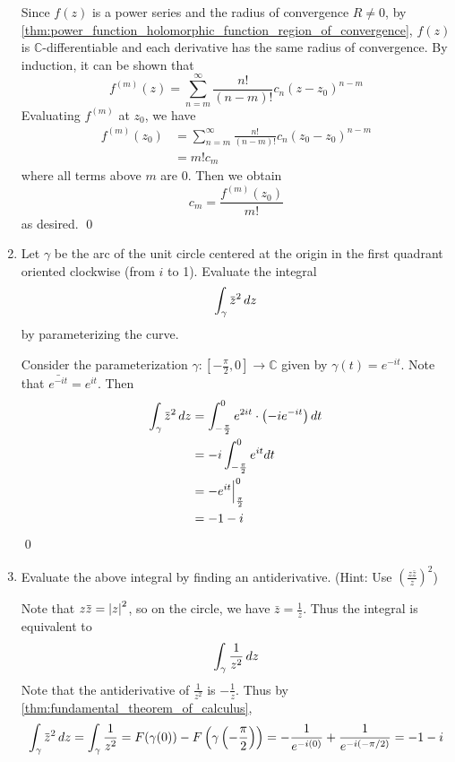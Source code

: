 \documentclass[11pt, oneside]{book}
\begin{document}
\begin{enumerate}
		\begin{solution}
			Since $f(z)$ is a power series and the radius of convergence $R \neq 0$, by \cref{thm:power_function_holomorphic_function_region_of_convergence}, $f(z)$ is $\mathbb{C}$-differentiable and each derivative has the same radius of convergence. By induction, it can be shown that
			\begin{equation*}
				f^{(m)}(z) = \sum_{n=m}^{\infty} \frac{n!}{(n - m)!} c_n (z - z_0)^{n - m} 
			\end{equation*}
			Evaluating $f^{(m)}$ at $z_0$, we have
			\begin{align*}
				f^{(m)}(z_0)
					&= \sum_{n=m}^{\infty} \frac{n!}{(n - m)!} c_n (z_0 - z_0)^{n - m} \\
					&= m! c_m
			\end{align*}
			where all terms above $m$ are 0. Then we obtain
			\begin{equation*}
				c_m = \frac{f^{(m)}(z_0)}{m!}
			\end{equation*}
			as desired. \qed
		\end{solution}
	\item Let $\gamma$ be the arc of the unit circle centered at the origin in the first quadrant oriented clockwise (from $i$ to 1). Evaluate the integral
		\begin{equation*}
			\int_{\gamma} \bar{z}^2 \dif{z}
		\end{equation*}
		by parameterizing the curve.

		\begin{solution}
			Consider the parameterization $\gamma: [ -\frac{\pi}{2}, 0 ] \to \mathbb{C}$ given by $\gamma(t) = e^{-it}$. Note that $\bar{e^{-it}} = e^{it}$. Then
			\begin{align*}
				\int_{\gamma} \bar{z}^2 \dif{z}
					&= \int_{-\frac{\pi}{2}}^{0} e^{2it} \cdot \left( -i e^{-it} \right) dt \\
					&= -i \int_{-\frac{\pi}{2}}^{0} e^{it} dt \\
					&= -e^{it} \at{\frac{\pi}{2}}{0} \\
					&= - 1 - i
			\end{align*}\qed
		\end{solution}
	\item Evaluate the above integral by finding an antiderivative. (Hint: Use $\left(\frac{z\bar{z}}{z} \right)^2$)
		\begin{solution}
			Note that $z\bar{z} = \abs{z}^2$, so on the circle, we have $\bar{z} = \frac{1}{z}$. Thus the integral is equivalent to
			\begin{equation*}
				\int_{\gamma} \frac{1}{z^2} \mathop{}\!d{z}
			\end{equation*}
			Note that the antiderivative of $\frac{1}{z^2}$ is $-\frac{1}{z}$. Thus by \cref{thm:fundamental_theorem_of_calculus},
			\begin{equation*}
				\int_{\gamma} \bar{z}^2 \dif{z} = \int_{\gamma} \frac{1}{z^2} = F(\gamma(0)) - F\left(\gamma\left(-\frac{\pi}{2}\right)\right) = -\frac{1}{e^{-i(0)}} + \frac{1}{e^{-i(-\pi/2)}} = - 1 - i 
			\end{equation*}
		\end{solution}


\end{enumerate}
\end{document}
